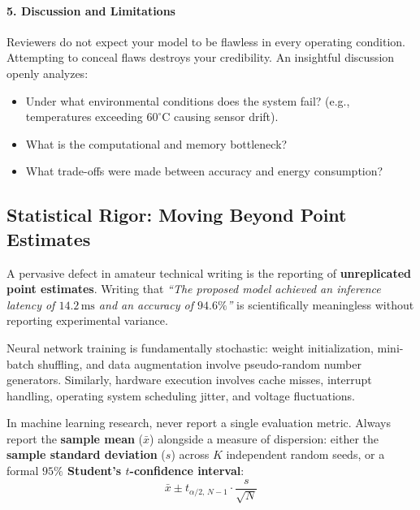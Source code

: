 \paragraph{5. Discussion and Limitations}
Reviewers do not expect your model to be flawless in every operating condition. Attempting to conceal flaws destroys your credibility. An insightful discussion openly analyzes:
\begin{itemize}
    \item Under what environmental conditions does the system fail? (e.g., temperatures exceeding $60^\circ\text{C}$ causing sensor drift).
    \item What is the computational and memory bottleneck?
    \item What trade-offs were made between accuracy and energy consumption?
\end{itemize}

\subsection{Statistical Rigor: Moving Beyond Point Estimates}\label{subsec:statistical_rigor}

A pervasive defect in amateur technical writing is the reporting of \textbf{unreplicated point estimates}. Writing that \emph{``The proposed model achieved an inference latency of $14.2\,\text{ms}$ and an accuracy of $94.6\%$''} is scientifically meaningless without reporting experimental variance.

Neural network training is fundamentally stochastic: weight initialization, mini-batch shuffling, and data augmentation involve pseudo-random number generators. Similarly, hardware execution involves cache misses, interrupt handling, operating system scheduling jitter, and voltage fluctuations.

\begin{keyidea}
In machine learning research, never report a single evaluation metric. Always report the \textbf{sample mean} ($\bar{x}$) alongside a measure of dispersion: either the \textbf{sample standard deviation} ($s$) across $K$ independent random seeds, or a formal \textbf{$95\%$ Student's $t$-confidence interval}:
\begin{equation}
\bar{x} \pm t_{\alpha/2, \, N-1} \cdot \frac{s}{\sqrt{N}}\label{eq:ci_formula}
\end{equation}
\end{keyidea}

